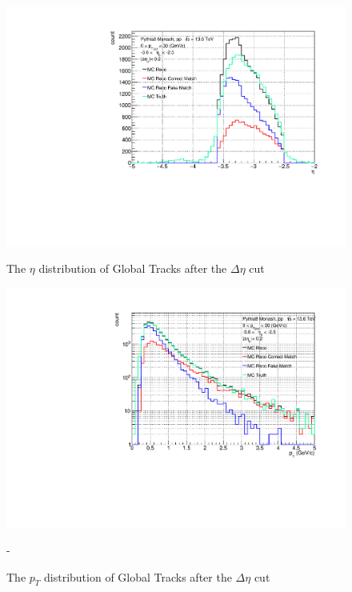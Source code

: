            \begin{figure}[H]
                \centering
                \begin{minipage}{0.45\textwidth} %
                    \centering
                    \includegraphics[width=\textwidth]{fig/3_5_6_etacut02_eta.pdf} %
                    \caption{The $\eta$ distribution of Global Tracks after the $\Delta \eta$ cut}
                    \label{Analysis:Matching:afterCut_eta}
                \end{minipage}
                \hfill
                \begin{minipage}{0.45\textwidth}
                    \centering
                    \includegraphics[width=\textwidth]{fig/3_5_6_etacut02_pt.pdf} %
                    \caption{The $p_T$ distribution of Global Tracks after the $\Delta \eta$ cut}
                    \label{Analysis:Matching:afterCut_pt}
                \end{minipage}-
            \end{figure}
